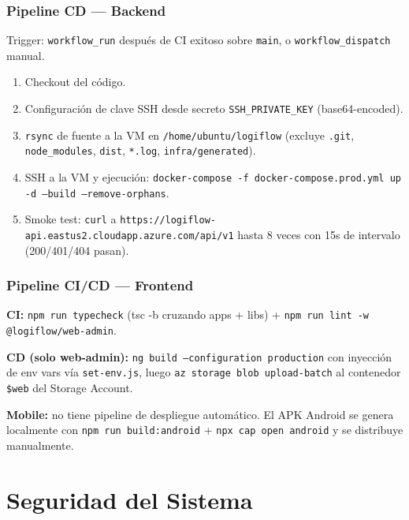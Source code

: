 \documentclass[12pt,a4paper,oneside]{article}
\begin{document}
\subsubsection{Pipeline CD --- Backend}

Trigger: \texttt{workflow\_run} despu\'es de CI exitoso sobre \texttt{main}, o \texttt{workflow\_dispatch} manual.

\begin{enumerate}[leftmargin=*]
  \item Checkout del c\'odigo.
  \item Configuraci\'on de clave SSH desde secreto \texttt{SSH\_PRIVATE\_KEY} (base64-encoded).
  \item \texttt{rsync} de fuente a la VM en \texttt{/home/ubuntu/logiflow} (excluye \texttt{.git}, \texttt{node\_modules}, \texttt{dist}, \texttt{*.log}, \texttt{infra/generated}).
  \item SSH a la VM y ejecuci\'on: \texttt{docker-compose -f docker-compose.prod.yml up -d --build --remove-orphans}.
  \item Smoke test: \texttt{curl} a \texttt{https://logiflow-api.eastus2.cloudapp.azure.com/api/v1} hasta 8 veces con 15s de intervalo (200/401/404 pasan).
\end{enumerate}

\subsubsection{Pipeline CI/CD --- Frontend}

\textbf{CI:} \texttt{npm run typecheck} (tsc -b cruzando apps + libs) + \texttt{npm run lint -w @logiflow/web-admin}.

\textbf{CD (solo web-admin):} \texttt{ng build --configuration production} con inyecci\'on de env vars v\'ia \texttt{set-env.js}, luego \texttt{az storage blob upload-batch} al contenedor \texttt{\$web} del Storage Account.

\textbf{Mobile:} no tiene pipeline de despliegue autom\'atico. El APK Android se genera localmente con \texttt{npm run build:android} + \texttt{npx cap open android} y se distribuye manualmente.

\section{Seguridad del Sistema}
\end{document}
